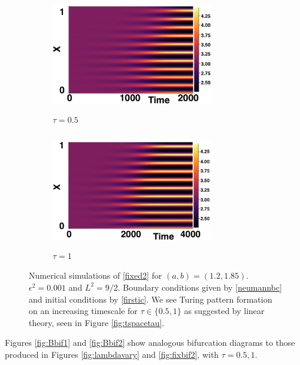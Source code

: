 \begin{figure}[H]
  \centering
\begin{subfigure}[t]{0.45\textwidth}
    \centering
    \includegraphics[width=7cm,height=5cm]{p2t05.png}
    \caption{$\tau=0.5$}
    \label{}
\end{subfigure}
\hfill
\begin{subfigure}[t]{0.45\textwidth}
    \centering
    \includegraphics[width=7cm,height=5cm]{p2t1.png}
    \caption{$\tau=1$}
    \label{}
\end{subfigure}
\caption{Numerical simulations of \eqref{fixed2} for $(a,b)=(1.2,1.85)$. $\epsilon^2=0.001$ and $L^2=9/2$. Boundary conditions given by \eqref{neumannbc} and initial conditions by \eqref{firstic}. We see Turing pattern formation on an increasing timescale for $\tau\in\{0.5,1\}$ as suggested by linear theory, seen in Figure \ref{fig:tspacetau}. }
\label{fig:appfig2}
\end{figure}

Figures \ref{fig:Bbif1} and \ref{fig:Bbif2} show analogous bifurcation diagrams to those produced in Figures \ref{fig:lambdavary} and \ref{fig:fixbif2}, with $\tau=0.5,1$.

